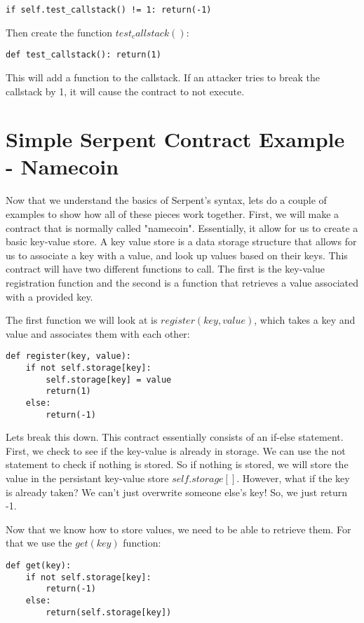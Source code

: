 \documentclass[12pt]{article}
\begin{document}
\begin{verbatim}
if self.test_callstack() != 1: return(-1)
\end{verbatim} 

Then create the function $test_callstack()$:

\begin{verbatim}
def test_callstack(): return(1)
\end{verbatim}

This will add a function to the callstack. If an attacker tries to break the callstack by 1, it will cause the contract to not execute.

\section{Simple Serpent Contract Example - Namecoin}
Now that we understand the basics of Serpent's syntax, lets do a couple of examples to show how all of these pieces work together. First, we will make a contract that is normally called "namecoin". Essentially, it allow for us to create a basic key-value store. A key value store is a data storage structure that allows for us to associate a key with a value, and look up values based on their keys. This contract will have two different functions to call. The first is the key-value registration function and the second is a function that retrieves a value associated with a provided key.

The first function we will look at is $register(key, value)$, which takes a key and value and associates them with each other:

\begin{verbatim}
def register(key, value):
	if not self.storage[key]:
		self.storage[key] = value
		return(1)
	else:
		return(-1)
\end{verbatim}

Lets break this down. This contract essentially consists of an if-else statement. First, we check to see if the key-value is already in storage. We can use the not statement to check if nothing is stored. So if nothing is stored, we will store the value in the persistant key-value store $self.storage[]$. However, what if the key is already taken? We can't just overwrite someone else's key! So, we just return -1. 

Now that we know how to store values, we need to be able to retrieve them. For that we use the $get(key)$ function:

\begin{verbatim}
def get(key):
	if not self.storage[key]:
		return(-1)
	else:
		return(self.storage[key])
\end{verbatim}
\end{document}

